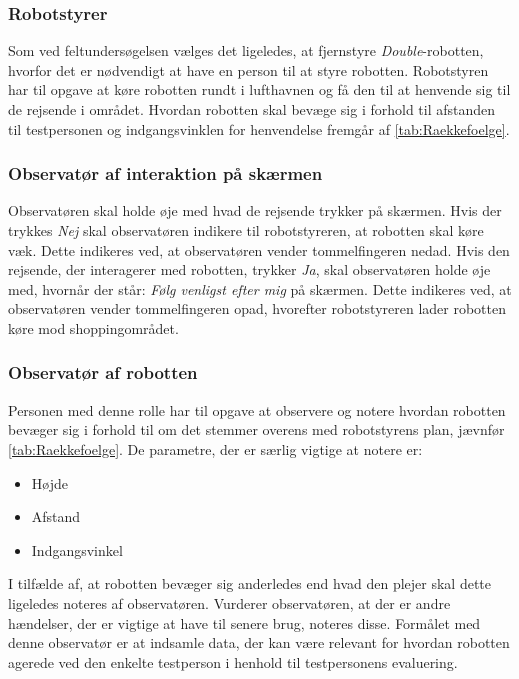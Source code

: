 \subsubsection*{Robotstyrer}
%
Som ved feltundersøgelsen vælges det ligeledes, at fjernstyre \textit{Double}-robotten, hvorfor det er nødvendigt at have en person til at styre robotten. Robotstyren har til opgave at køre robotten rundt i lufthavnen og få den til at henvende sig til de rejsende i området. Hvordan robotten skal bevæge sig i forhold til afstanden til testpersonen og indgangsvinklen for henvendelse fremgår af \autoref{tab:Raekkefoelge}.

\subsubsection*{Observatør af interaktion på skærmen}
%
Observatøren skal holde øje med hvad de rejsende trykker på skærmen. Hvis der trykkes \textit{Nej} skal observatøren indikere til robotstyreren, at robotten skal køre væk. Dette indikeres ved, at observatøren vender tommelfingeren nedad. Hvis den rejsende, der interagerer med robotten, trykker \textit{Ja}, skal observatøren holde øje med, hvornår der står: \textit{Følg venligst efter mig} på skærmen. Dette indikeres ved, at observatøren vender tommelfingeren opad, hvorefter robotstyreren lader robotten køre mod shoppingområdet. 

\subsubsection*{Observatør af robotten}
%
Personen med denne rolle har til opgave at observere og notere hvordan robotten bevæger sig i forhold til om det stemmer overens med robotstyrens plan, jævnfør \autoref{tab:Raekkefoelge}. De parametre, der er særlig vigtige at notere er:\blankline 
%
\begin{itemize}
	\item Højde
	\item Afstand
	\item Indgangsvinkel\blankline
\end{itemize}
\noindent
%
I tilfælde af, at robotten bevæger sig anderledes end hvad den plejer skal dette ligeledes noteres af observatøren. Vurderer observatøren, at der er andre hændelser, der er vigtige at have til senere brug, noteres disse. Formålet med denne observatør er at indsamle data, der kan være relevant for hvordan robotten agerede ved den enkelte testperson i henhold til testpersonens evaluering.

